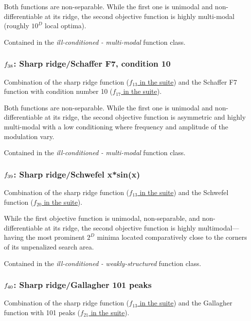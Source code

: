 \documentclass[letterpaper,12pt,english]{article}
\begin{document}
Both functions are non-separable. While the first one
is unimodal and non-differentiable at its ridge, the second objective
function is highly multi-modal (roughly \(10^D\) local optima).

Contained in the \emph{ill-conditioned - multi-modal} function class.


\subsubsection{\protect\(f_{38}\protect\): Sharp ridge/Schaffer F7, condition 10}
\label{index:f38}\label{index:sharp-ridge-schaffer-f7-condition-10}
Combination of the sharp ridge function (\href{http://coco.lri.fr/downloads/download15.03/bbobdocfunctions.pdf\#page=65}{\(f_{13}\) in the  suite}) and the
Schaffer F7 function with condition number 10
(\href{http://coco.lri.fr/downloads/download15.03/bbobdocfunctions.pdf\#page=85}{\(f_{17}\) in the  suite}).

Both functions are non-separable. While the first one
is unimodal and non-differentiable at its ridge, the second objective
function is asymmetric and highly multi-modal with a low conditioning where
frequency and amplitude of the modulation vary.

Contained in the \emph{ill-conditioned - multi-modal} function class.


\subsubsection{\protect\(f_{39}\protect\): Sharp ridge/Schwefel x*sin(x)}
\label{index:f39}\label{index:sharp-ridge-schwefel-x-sin-x}
Combination of the sharp ridge function (\href{http://coco.lri.fr/downloads/download15.03/bbobdocfunctions.pdf\#page=65}{\(f_{13}\) in the  suite}) and the
Schwefel function (\href{http://coco.lri.fr/downloads/download15.03/bbobdocfunctions.pdf\#page=100}{\(f_{20}\) in the  suite}).

While the first objective function is unimodal, non-separable, and
non-differentiable at its ridge, the second objective function is highly
multimodal---having the most prominent \(2^D\) minima located
comparatively close to the corners of its unpenalized search area.

Contained in the \emph{ill-conditioned - weakly-structured} function class.


\subsubsection{\protect\(f_{40}\protect\): Sharp ridge/Gallagher 101 peaks}
\label{index:f40}\label{index:sharp-ridge-gallagher-101-peaks}
Combination of the sharp ridge function (\href{http://coco.lri.fr/downloads/download15.03/bbobdocfunctions.pdf\#page=65}{\(f_{13}\) in the  suite}) and the
Gallagher function with 101 peaks (\href{http://coco.lri.fr/downloads/download15.03/bbobdocfunctions.pdf\#page=105}{\(f_{21}\) in the  suite}).
\end{document}
